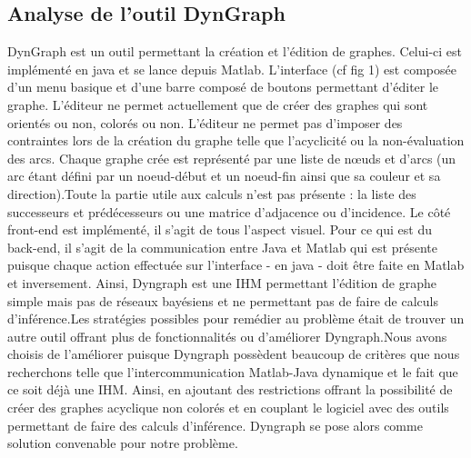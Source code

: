 \documentclass[conference]{IEEEtran}
\begin{document}
\subsection{Analyse de l'outil DynGraph}
\vspace{0.3cm} 

DynGraph est un outil permettant la création et l'édition de graphes. Celui-ci est implémenté en java et se lance depuis Matlab.
L'interface (cf fig 1) est composée d'un menu basique et d'une barre composé de boutons permettant d'éditer le graphe. L'éditeur ne permet actuellement que de créer des graphes qui sont orientés ou non, colorés ou non. L'éditeur ne permet pas d'imposer des contraintes lors de la création du graphe telle que l'acyclicité ou la non-évaluation des arcs. Chaque graphe crée est représenté par une liste de nœuds et d'arcs (un arc étant défini par un noeud-début et un noeud-fin ainsi que sa couleur et sa direction).Toute la partie utile aux calculs n'est pas présente : la liste des successeurs et prédécesseurs ou une matrice d'adjacence ou d'incidence. Le côté front-end est implémenté, il s'agit de tous l'aspect visuel. Pour ce qui est du back-end, il s'agit de la communication entre Java et Matlab qui est présente puisque chaque action effectuée sur l'interface - en java - doit être faite en Matlab et inversement. Ainsi, Dyngraph est une IHM permettant l'édition de graphe simple mais pas de réseaux bayésiens et ne permettant pas de faire de calculs d'inférence.Les stratégies possibles pour remédier au problème était de trouver un autre outil offrant plus de fonctionnalités ou d'améliorer Dyngraph.Nous avons choisis de l'améliorer puisque Dyngraph possèdent beaucoup de critères que nous recherchons telle que l'intercommunication Matlab-Java dynamique et le fait que ce soit déjà une IHM. Ainsi, en ajoutant des restrictions offrant la possibilité de créer des graphes acyclique non colorés et en couplant le logiciel avec des outils permettant de faire des calculs d'inférence. Dyngraph se pose alors comme solution convenable pour notre problème.
\end{document}
